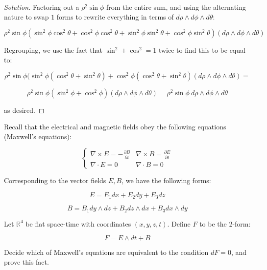 \documentclass[10pt]{article}
\theoremstyle{nonumberplain}%
\newenvironment{problem}[2][]{\begin{trivlist}
\item[\hskip \labelsep {\bfseries #1}\hskip \labelsep {\bfseries #2.}]}{\end{trivlist}}
\begin{document}
\begin{proof}[Solution]
Factoring out a $\rho^2 \sin \phi$ from the entire sum, and using the alternating nature to swap $1$ forms to rewrite everything in terms of $d\rho \wedge d\phi \wedge d\theta$:

$$ \rho^2 \sin \phi(\sin^2 \phi \cos^2 \theta + \cos^2 \phi \cos^2 \theta + \sin^2 \phi \sin^2 \theta + \cos^2 \phi \sin^2 \theta)  (d\rho \wedge d\phi \wedge d\theta) $$

Regrouping, we use the fact that $\sin^2 + \cos^2 = 1$ twice to find this to be equal to:

$$  \rho^2 \sin \phi ( \sin^2 \phi(\cos^2 \theta + \sin^2 \theta)+ \cos^2 \phi(\cos^2 \theta + \sin^2 \theta) (d\rho \wedge d\phi \wedge d\theta) = $$

$$  \rho^2 \sin \phi ( \sin^2 \phi + \cos^2 \phi)  (d\rho \wedge d\phi \wedge d\theta) =  \rho^2 \sin\phi \: d\rho \wedge d\phi \wedge d\theta $$

as desired.



\end{proof}

\begin{problem}{Question 4}

Recall that the electrical and magnetic fields obey the following equations (Maxwell's equations):

$$ \begin{cases} \nabla \times E = -\frac{\partial B}{\partial t} & \nabla \times B = \frac{\partial E}{\partial t} \\ \nabla \cdot E = 0  & \nabla \cdot B = 0 \end{cases} $$

Corresponding to the vector fields $E, B$, we have the following forms:

$$ E = E_1 dx + E_2 dy + E_3 dz$$

$$ B = B_1 dy \wedge dz + B_2 dz \wedge dx + B_3 dx \wedge dy $$

Let $\mathbb{R}^4$ be flat space-time with coordinates $(x,y,z,t)$. Define $F$ to be the 2-form:

$$ F= E \wedge dt + B$$

Decide which of Maxwell's equations are equivalent to the condition $dF = 0$, and prove this fact.

\end{problem}
\end{document}
